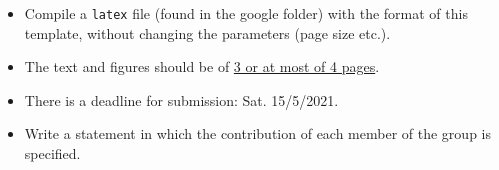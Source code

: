 {
\bf
\begin{itemize}
\item Compile a {\tt latex} file (found in the google folder) with the format of this template,  without changing the parameters (page size etc.).
\item The text and figures should be of \underline{3 or at most of 4 pages}.
\item There is a deadline for submission: Sat. 15/5/2021.
\item Write a statement in which the contribution of each member of the group is specified.
\end{itemize}
}